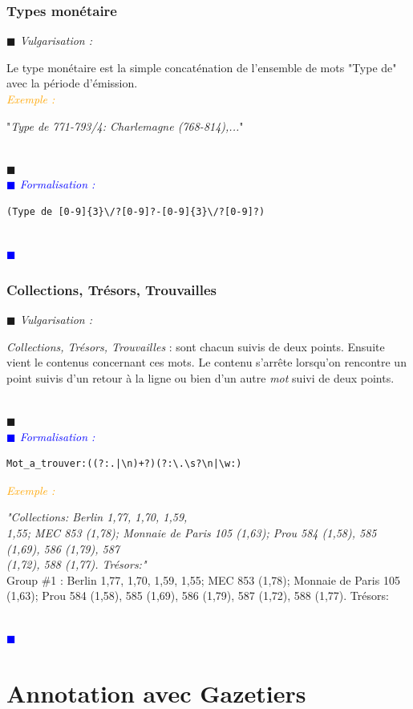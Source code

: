 \documentclass[a4paper, 11pt]{book}
\newenvironment{vulgarisation}
    {
    \textit{\textcolor{dark-blue}{$\blacksquare$  Vulgarisation : \\}}

    }
    {
    ~\\\textcolor{dark-blue}{$\blacksquare$}\\
    }
\newenvironment{formalisation}
    {
    \textit{\textcolor{blue}{$\blacksquare$  Formalisation : \\}}
    }
    {
    ~\\\textcolor{blue}{$\blacksquare$}\\
    }
\newenvironment{exemple}
    {
    \textit{\textcolor{orange}{
    Exemple : \\}}
    }
    {\\
    }
\begin{document}
\subsubsection{Types monétaire}
\begin{vulgarisation}
	Le type monétaire est la simple concaténation de l'ensemble de mots "Type de" avec la période d'émission.\\
	\begin{exemple}
		"\emph{Type de 771-793/4: Charlemagne (768-814),...}"
	\end{exemple}
\end{vulgarisation}
\begin{formalisation}
	\begin{verbatim}
(Type de [0-9]{3}\/?[0-9]?-[0-9]{3}\/?[0-9]?)
	\end{verbatim}
\end{formalisation}

\subsubsection{Collections, Trésors, Trouvailles}
\begin{vulgarisation}
	\textit{Collections, Trésors, Trouvailles} : sont chacun suivis de deux points. Ensuite vient le contenus concernant ces mots. Le contenu s'arrête lorsqu'on rencontre un point suivis d'un retour à la ligne ou bien d'un autre \textit{mot} suivi de deux points.
\end{vulgarisation}
\begin{formalisation}
	\begin{verbatim}
Mot_a_trouver:((?:.|\n)+?)(?:\.\s?\n|\w:)
	\end{verbatim}
	\begin{exemple}
		\emph{"Collections: Berlin 1,77, 1,70, 1,59, \\
			1,55; MEC 853 (1,78); Monnaie de Paris 105 (1,63); Prou 584 (1,58), 585 (1,69), 586 (1,79), 587 \\
			(1,72), 588 (1,77). Trésors:"}\\
		Group \#1 :  Berlin 1,77, 1,70, 1,59,
		1,55; MEC 853 (1,78); Monnaie de Paris 105 (1,63); Prou 584 (1,58), 585 (1,69), 586 (1,79), 587 (1,72), 588 (1,77). Trésors:
	\end{exemple}
\end{formalisation}


\section{Annotation avec Gazetiers}
\end{document}
